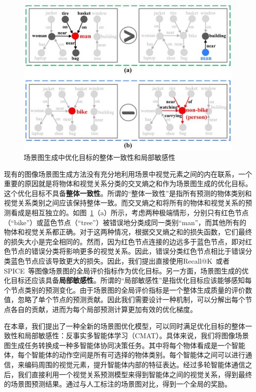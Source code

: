 \begin{figure}[t]
    \centering
    \includegraphics[width=0.9\linewidth]{chapter4/res/motivation.pdf}
    \caption{场景图生成中优化目标的整体一致性和局部敏感性}
    \label{ch4:fig:motivation}
\end{figure}

现有的图像场景图生成方法没有充分地利用场景中视觉元素之间的内在联系，一个重要的原因就是将物体和视觉关系分类的交叉熵之和作为场景图生成的优化目标。这个优化目标不具备\textbf{整体一致性}。所谓的“整体一致性”是指所有预测的物体类别和视觉关系类别之间应该保持整体一致。而交叉熵之和将所有的物体和视觉关系的预测看成是相互独立的。如图~\ref{ch4:fig:motivation}（a）所示，考虑两种极端情形，分别只有红色节点（“bike”）或蓝色节点（“tree”）被错误地分类成同一类别“man”，而其他所有的物体和视觉关系都正确。对于这两种情况，根据交叉熵之和的损失函数，它们最终的损失大小是完全相同的。然而，因为红色节点连接的边远多于蓝色节点，即对红色节点的错误分类将影响更多的视觉关系。因此，错误分类红色节点相比于错误分类蓝色节点应该导致更大的损失。因此，我们提出直接使用Recall@K~\cite{lu2016visual}或者SPICE~\cite{anderson2016spice}等图像场景图的全局评价指标作为优化目标。另一方面，场景图生成的优化目标还应该具备\textbf{局部敏感性}。所谓的“局部敏感性”是指优化目标应该能够感知每个节点类别的预测变化。由于场景图的全局评价指标是一个整体生成质量的评价数值，忽略了单个节点的预测贡献。因此我们需要设计一种机制，可以分解出每个节点各自的贡献，进而为每个局部预测计算更加有效的优化梯度。

在本章，我们提出了一种全新的场景图优化模型，可以同时满足优化目标的整体一致性和局部敏感性：反事实多智能体学习（CMAT）。具体来说，我们将图像场景图生成任务转换成一种多智能体协同决策任务。其中将每个物体看成是一个智能体，每个智能体的动作空间是所有可选择的物体类别。每个智能体之间可以进行通信，来编码周围的视觉元素，提升智能体内部的特征表达。经过多轮智能体通信之后，我们直接利用一个视觉关系预测模型来得到智能体之间的视觉关系，得到最终的场景图预测结果。通过与人工标注的场景图对比，得到一个全局的奖励。

